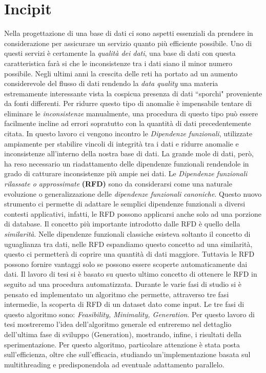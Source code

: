 \section{Incipit}
Nella progettazione di una base di dati ci sono aspetti essenziali da prendere in considerazione per assicurare un servizio quanto più efficiente possibile.
Uno di questi servizi è certamente la \emph{qualità dei dati}, una base di dati con questa caratteristica farà si che le inconsistenze tra i dati siano il minor numero possibile.
Negli ultimi anni la crescita delle reti ha portato ad un aumento considerevole del flusso di dati  rendendo la \emph{data quality} una materia estremamente interessante vista la cospicua presenza di dati ``sporchi" proveniente da fonti differenti.
Per ridurre questo tipo di anomalie è impensabile tentare di eliminare le \emph{inconsistenze} manualmente,  una procedura di questo tipo può essere facilmente incline ad errori sopratutto con la quantità di dati precedentemente citata.
In questo lavoro ci vengono incontro le \emph{Dipendenze funzionali}, utilizzate ampiamente per stabilire vincoli di integrità tra i dati e ridurre anomalie e inconsistenze all'interno della nostra base di dati.
La grande mole di dati, però, ha reso necessario un riadattamento delle dipendenze funzionali rendendole in grado di catturare inconsistenze più ampie nei dati. 
Le \emph{Dipendenze funzionali rilassate o approssimate} \textbf{(RFD)} sono da considerarsi come una naturale evoluzione o generalizzazione delle \emph{dipendenze funzionali canoniche}.
Questo nuovo strumento ci permette di adattare le semplici dipendenze funzionali a diversi contesti applicativi, infatti, le RFD possono applicarsi anche solo ad una porzione di database.
Il concetto più importante introdotto dalle RFD è quello della \emph{similarità}.
Nelle dipendenze funzionali classiche esisteva soltanto il concetto di uguaglianza tra dati, nelle RFD espandiamo questo concetto ad una similarità, questo ci permetterà di coprire una quantità di dati maggiore.
Tuttavia le RFD possono fornire vantaggi solo se possono essere scoperte automaticamente dai dati.
Il lavoro di tesi si è basato su questo ultimo concetto di ottenere le RFD in seguito ad una procedura automatizzata.
Durante le varie fasi di studio si è pensato ed implementato un algoritmo che permette, attraverso tre fasi intermedie, la scoperta di RFD di un dataset dato come input.
Le tre fasi di questo algoritmo sono: \emph{Feasibility, Minimality, Generation}.
Per questo lavoro di tesi mostreremo l'idea dell'algoritmo generale ed entreremo nel dettaglio dell'ultima fase di sviluppo (Generation), mostrando, infine, i risultati della sperimentazione.
Per questo algoritmo, particolare attenzione è stata posta sull'efficienza, oltre che sull'efficacia, studiando un'implementazione basata sul multithreading e predisponendola ad eventuale adattamento parallelo.
